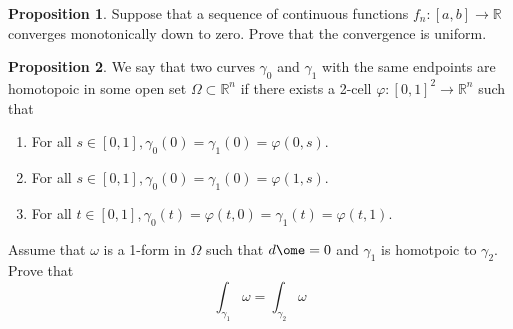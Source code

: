 \documentclass[10pt, oneside]{article}
\newcommand{\bbR}{\mathbb{R}}
\theoremstyle{definition}
\newtheorem{prop}{Proposition}
\begin{document}
\begin{prop}
    Suppose that a sequence of continuous functions $f_n: [a,b]\to \bbR$ converges monotonically down to zero. Prove that the convergence is uniform.
\end{prop}
\begin{prop}
    We say that two curves $\gamma_0$ and $\gamma_1$ with the same endpoints are homotopoic in some open set $\Omega \subset \bbR^n$ if there exists a 2-cell $\varphi: [0,1]^2 \to \bbR^n$ such that
    \begin{enumerate}
        \item For all $s\in [0,1], \gamma_0(0) = \gamma_1(0) = \varphi(0,s).$
        \item For all $s\in [0,1], \gamma_0(0) = \gamma_1(0) = \varphi(1,s).$
        \item For all $t\in [0,1], \gamma_0(t) = \varphi(t,0) = \gamma_1(t)= \varphi(t,1).$
    \end{enumerate}
    Assume that $\omega$ is a 1-form in $\Omega$ such that $d\ome = 0$ and $\gamma_1$ is homotpoic to $\gamma_2.$ Prove that 
    \[\int_{\gamma_1}\omega = \int_{\gamma_2}\omega\]
\end{prop}
\end{document}
